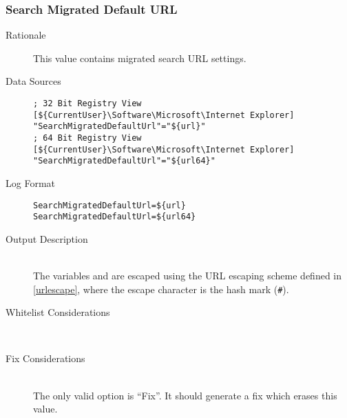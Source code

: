 \subsubsection{Search Migrated Default URL}
\begin{description}
\item[Rationale] This value contains migrated search URL settings.

\item[Data Sources] \hfill
\vspace{-\baselineskip}
\begin{verbatim}
; 32 Bit Registry View
[${CurrentUser}\Software\Microsoft\Internet Explorer]
"SearchMigratedDefaultUrl"="${url}"
; 64 Bit Registry View
[${CurrentUser}\Software\Microsoft\Internet Explorer]
"SearchMigratedDefaultUrl"="${url64}"
\end{verbatim}
\item[Log Format] \hfill
\vspace{-\baselineskip}
\begin{verbatim} 
SearchMigratedDefaultUrl=${url}
SearchMigratedDefaultUrl=${url64}
\end{verbatim}
\item[Output Description] \hfill \\
The variables  and  are escaped using the URL escaping
scheme defined in \ref{urlescape}, where the escape character is the hash mark
(\verb|#|).
\item[Whitelist Considerations] \hfill \\

\item[Fix Considerations] \hfill \\
The only valid option is ``Fix''. It should generate a fix which erases this
value.
\end{description}

